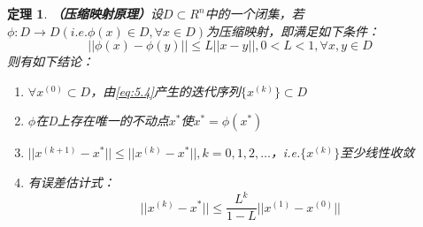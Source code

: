 \documentclass[a4paper]{article}
\newtheorem{theorem}{定理}[section]
\begin{document}
\begin{theorem}
    \textbf{（压缩映射原理）}设$D\subset R^n$中的一个闭集，若$\phi:D\rightarrow D (i.e. \phi(x)\in D, \forall x \in D)$为压缩映射，即满足如下条件：
    \begin{equation}
        ||\phi(x)-\phi(y) ||\le L||x-y||, 0<L<1, \forall x,y\in D
    \end{equation}
    则有如下结论：
    \begin{enumerate}
        \item $\forall x^{(0)}\subset D $，由\ref{eq:5.4}产生的迭代序列$\{x^{(k)} \}\subset D$
        \item $\phi$在D上存在唯一的不动点$x^*$使$x^*=\phi(x^*)$
        \item $||x^{(k+1)}-x^* ||\le ||x^{(k)}-x^* ||,k=0,1,2,\dots$，i.e.$\{x^{(k)} \}$至少线性收敛
        \item 有误差估计式：
        \begin{equation}
            ||x^{(k)}-x^* ||\le \frac{L^k}{1-L}||x^{(1)}-x^{(0)} ||
        \end{equation}
    \end{enumerate}
\end{theorem}
\end{document}
